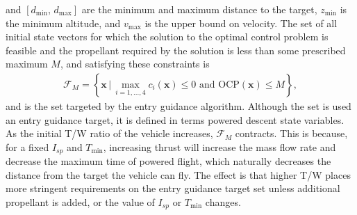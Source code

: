 and $[d_{\min},\,d_{\max}]$ are the minimum and maximum distance to the target, $z_{\min}$ is the minimum altitude, and $v_{\max}$ is the upper bound on velocity. 
The set of all initial state vectors for which the solution to the optimal control problem is feasible and the propellant required by the solution is less than some prescribed maximum $ M $, and satisfying these constraints is 
\begin{align}
\mathcal{F}_{M} = \left\{\mathbf{x}\,|\, \max_{i={1,...,4}}c_i(\mathbf{x})\le 0\,\,\mathrm{and}\,\,\mathrm{OCP}(\mathbf{x}) \le M \right\},
\end{align}
and is the set targeted by the entry guidance algorithm. Although the set is used an entry guidance target, it is defined in terms powered descent state variables. As the initial T/W ratio of the vehicle increases, $\mathcal{F}_{M}$ contracts. This is because, for a fixed $I_{sp}$ and $T_{\min}$, increasing thrust will increase the mass flow rate and decrease the maximum time of powered flight, which naturally decreases the distance from the target the vehicle can fly. The effect is that higher T/W places more stringent requirements on the entry guidance target set unless additional propellant is added, or the value of $I_{sp}$ or $T_{\min}$ changes.

